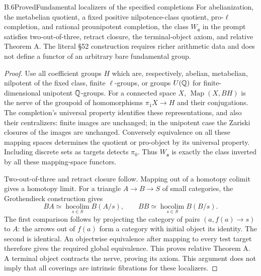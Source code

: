 \begin{statement}{B.6}{Proved}{Fundamental localizers of the specified completions}
For abelianization, the metabelian quotient, a fixed positive
nilpotence-class quotient, pro-$\ell$ completion, and rational
prounipotent completion, the class $W_{\mathfrak a}$ in the
prompt satisfies two-out-of-three, retract closure, the
terminal-object axiom, and relative Theorem A. The literal
\S52 construction requires richer arithmetic data and does not
define a functor of an arbitrary bare fundamental group.
\end{statement}
\begin{proof}
Use all coefficient groups $H$ which are, respectively, abelian,
metabelian, nilpotent of the fixed class, finite $\ell$-groups,
or groups $U(\mathbb Q)$ for finite-dimensional unipotent $\mathbb Q$-groups.
For a connected space $X$, $\operatorname{Map}(X,BH)$ is the
nerve of the groupoid of homomorphisms $\pi_1X\to H$ and their
conjugations. The completion's universal property identifies
these representations, and also their centralizers: finite
images are unchanged; in the unipotent case the Zariski closures
of the images are unchanged. Conversely equivalence on all
these mapping spaces determines the quotient or pro-object by
its universal property. Including discrete sets as targets
detects $\pi_0$. Thus $W_{\mathfrak a}$ is exactly the class
inverted by all these mapping-space functors.

Two-out-of-three and retract closure follow. Mapping out of a
homotopy colimit gives a homotopy limit. For a triangle
$A\to B\to S$ of small categories, the Grothendieck construction
gives
\[
 BA\simeq\operatorname*{hocolim}_{s\in S}B(A/s),\qquad
 BB\simeq\operatorname*{hocolim}_{s\in S}B(B/s).
\]
The first comparison follows by projecting the category of
pairs $(a,f(a)\to s)$ to $A$: the arrows out of $f(a)$ form
a category with initial object its identity. The second is
identical. An objectwise equivalence after mapping to every
test target therefore gives the required global equivalence.
This proves relative Theorem A. A terminal object contracts the
nerve, proving its axiom. This argument does not imply that all
coverings are intrinsic fibrations for these localizers.
\end{proof}

